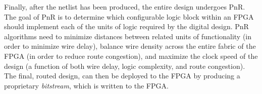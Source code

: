 Finally, after the netlist has been produced, the entire design undergoes PnR.
The goal of PnR is to determine which configurable logic block within an FPGA should implement each of the units of logic required by the digital design.
PnR algorithms need to minimize distances between related units of functionality (in order to minimize wire delay), balance wire density across the entire fabric of the FPGA (in order to reduce route congestion), and maximize the clock speed of the design (a function of both wire delay, logic complexity, and route congestion).
The final, routed design, can then be deployed to the FPGA by producing a proprietary \emph{bitstream}, which is written to the FPGA.

